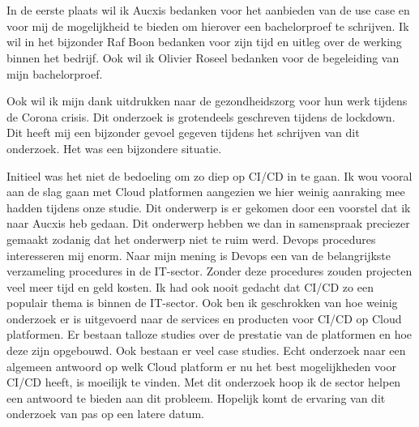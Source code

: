 
\chapter*{}
\label{ch:voorwoord}
In de eerste plaats wil ik Aucxis bedanken voor het aanbieden van de use case en voor mij de mogelijkheid te bieden om hierover een bachelorproef te schrijven. Ik wil in het bijzonder Raf Boon bedanken voor zijn tijd en uitleg over de werking binnen het bedrijf. Ook wil ik Olivier Roseel bedanken voor de begeleiding van mijn bachelorproef.

Ook wil ik mijn dank uitdrukken naar de gezondheidszorg voor hun werk tijdens de Corona crisis. Dit onderzoek is grotendeels geschreven tijdens de lockdown. Dit heeft mij een bijzonder gevoel gegeven tijdens het schrijven van dit onderzoek. Het was een bijzondere situatie.

Initieel was het niet de bedoeling om zo diep op CI/CD in te gaan. Ik wou vooral aan de slag gaan met Cloud platformen aangezien we hier weinig aanraking mee hadden tijdens onze studie. Dit onderwerp is er gekomen door een voorstel dat ik naar Aucxis heb gedaan. Dit onderwerp hebben we dan in samenspraak preciezer gemaakt zodanig dat het onderwerp niet te ruim werd. Devops procedures interesseren mij enorm. Naar mijn mening is Devops een van de belangrijkste verzameling procedures in de IT-sector. Zonder deze procedures zouden projecten veel meer tijd en geld kosten. Ik had ook nooit gedacht dat CI/CD zo een populair thema is binnen de IT-sector. Ook ben ik geschrokken van hoe weinig onderzoek er is uitgevoerd naar de services en producten voor CI/CD op Cloud platformen. Er bestaan talloze studies over de prestatie van de platformen en hoe deze zijn opgebouwd. Ook bestaan er veel case studies. Echt onderzoek naar een algemeen antwoord op welk Cloud platform er nu het best mogelijkheden voor CI/CD heeft, is moeilijk te vinden. Met dit onderzoek hoop ik de sector helpen een antwoord te bieden aan dit probleem.  Hopelijk komt de ervaring van dit onderzoek van pas op een latere datum.


